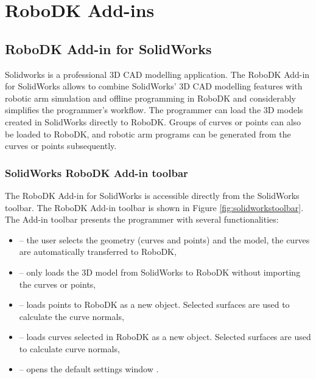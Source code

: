 \section{RoboDK Add-ins}

\subsection{RoboDK Add-in for SolidWorks}

Solidworks is a professional 3D CAD modelling application. The RoboDK Add-in for SolidWorks allows to combine SolidWorks' 3D CAD modelling features with robotic arm simulation and offline programming in RoboDK and considerably simplifies the programmer's workflow. The programmer can load the 3D models created in SolidWorks directly to RoboDK. Groups of curves or points can also be loaded to RoboDK, and robotic arm programs can be generated from the curves or points subsequently.

\subsubsection*{SolidWorks RoboDK Add-in toolbar}

The RoboDK Add-in for SolidWorks is accessible directly from the SolidWorks toolbar.  The RoboDK Add-in toolbar is shown in Figure  \ref{fig:solidworkstoolbar}. The Add-in toolbar presents the programmer with several functionalities:

\begin{itemize}
    \item {} -- the user selects the geometry (curves and points) and the model, the curves are automatically transferred to RoboDK,
    \item {} -- only loads the 3D model from SolidWorks to RoboDK without importing the curves or points,
    \item {} -- loads points to RoboDK as a new object. Selected surfaces are used to calculate the curve normals, 
    \item {} --  loads curves selected in RoboDK as a new object. Selected surfaces are used to calculate curve normals, 
    \item {} -- opens the default settings window \cite{robodksolidworks}.
\end{itemize}

